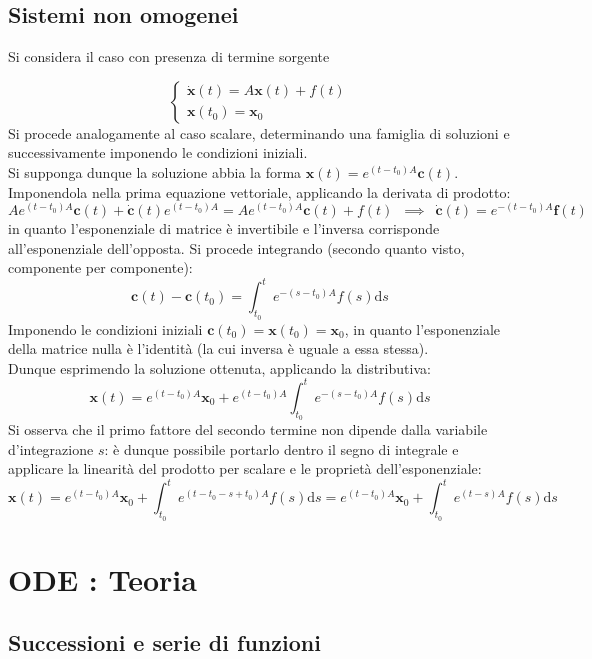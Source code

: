 \documentclass[10pt]{article}
\theoremstyle{plain}
\begin{document}
\subsection{Sistemi non omogenei}
Si considera il caso con presenza di termine sorgente

\[\begin{cases}
\dot{\mathbf{x}}(t) = A \mathbf{x}(t) + f(t)\\
\mathbf{x}(t_0) = \mathbf{x}_0
\end{cases}\]
Si procede analogamente al caso scalare, determinando una famiglia di soluzioni e successivamente imponendo le condizioni iniziali.
\\Si supponga dunque la soluzione abbia la forma $\displaystyle \mathbf{x}(t) = e^{(t - t_0) A} \mathbf{c}(t)$. Imponendola nella prima equazione vettoriale, applicando la derivata di prodotto:
\[A e^{(t - t_0) A} \mathbf{c}(t) + \dot{\mathbf{c}}(t) e^{(t - t_0) A} = A e^{(t - t_0) A} \mathbf{c}(t) + f(t) \enspace \implies \enspace \dot{\mathbf{c}}(t) = e^{- (t - t_0) A} \mathbf{f}(t)\]
in quanto l'esponenziale di matrice è invertibile e l'inversa corrisponde all'esponenziale dell'opposta. Si procede integrando (secondo quanto visto, componente per componente):
\[\mathbf{c}(t) - \mathbf{c}(t_0) = \int_{t_0}^{t} e^{- (s - t_0) A} f(s)\textrm{d}s\]
Imponendo le condizioni iniziali $\mathbf{c}(t_0) = \mathbf{x}(t_0) = \mathbf{x}_0$, in quanto l'esponenziale della matrice nulla è l'identità (la cui inversa è uguale a essa stessa).
\\Dunque esprimendo la soluzione ottenuta, applicando la distributiva:
\[\mathbf{x}(t) = e^{(t - t_0) A}\mathbf{x}_0 + e^{(t - t_0) A} \int_{t_0}^{t} e^{- (s - t_0) A} f(s)\textrm{d}s\]
Si osserva che il primo fattore del secondo termine non dipende dalla variabile d'integrazione $s$: è dunque possibile portarlo dentro il segno di integrale e applicare la linearità del prodotto per scalare e le proprietà dell'esponenziale:
\[\mathbf{x}(t) = e^{(t - t_0) A}\mathbf{x}_0 + \int_{t_0}^{t} e^{(t - t_0 - s + t_0) A} f(s)\textrm{d}s = e^{(t - t_0) A}\mathbf{x}_0 + \int_{t_0}^{t} e^{(t - s) A} f(s)\textrm{d}s\]


\section{ODE : Teoria}
\subsection{Successioni e serie di funzioni}
\end{document}
